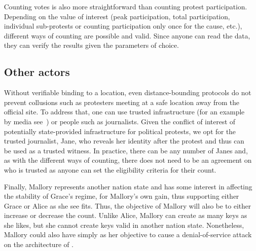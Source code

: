 Counting votes is also more straightforward than counting protest participation. 
Depending on the value of interest (\eg peak participation, total participation, individual sub-protests or counting participation only once for the cause, etc.), different ways of counting are
possible and valid. 
Since anyone can read the data, they can verify the results given the parameters of choice.

\subsection{Other actors}

Without verifiable binding to a location, even distance-bounding protocols do not prevent collusions such as protesters meeting at a safe location away from the official site. 
To address that, one can use trusted infrastructure (for an example by media see~\cite{LeMondeProtestingSolution}) or people such as journalists. 
Given the conflict of interest of potentially state-provided infrastructure for political protests, we opt for the trusted journalist, Jane, who reveals her identity after the protest and thus can be used as a trusted witness. 
In practice, there can be any number of  Janes and, as with the different ways of counting, there does not need to be an agreement on who is trusted as anyone can set the eligibility criteria for their count.

Finally, Mallory represents another nation state and has some interest in affecting the stability of Grace's regime, for Mallory's own gain, thus supporting either Grace or Alice as she see fits.  
Thus, the objective of Mallory will also be to either increase or decrease the count. 
Unlike Alice, Mallory can create as many keys as she likes, but she cannot create keys valid in another nation state. 
Nonetheless, Mallory could also have simply as her objective to cause a denial-of-service attack on the architecture of \PRIVO.



